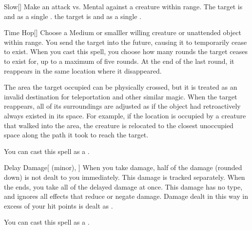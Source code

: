 \lowercase{\hypertarget{spell:Slow}{}}\label{spell:Slow}
\begin{ability}[\nth{1}]{\hypertarget{spell:Slow}{Slow}}[]
Make an attack vs. Mental against a creature within \rngmed range.
\hit The target is  and  as a single .
\crit the target is  and  as a single .
\end{ability}
\vspace{0.25em}



\lowercase{\hypertarget{spell:Time Hop}{}}\label{spell:Time Hop}
\begin{ability}[\nth{2}]{\hypertarget{spell:Time Hop}{Time Hop}}[]
Choose a Medium or smalller willing creature or unattended object within \rngmed range.
You send the target into the future, causing it to temporarily cease to exist.
When you cast this spell, you choose how many rounds the target ceases to exist for, up to a maximum of five rounds.
At the end of the last round, it reappears in the same location where it disappeared.

The area the target occupied can be physically crossed, but it is treated as an invalid destination for teleportation and other similar magic.
When the target reappears, all of its surroundings are adjusted as if the object had retroactively always existed in its space.
For example, if the location is occupied by a creature that walked into the area, the creature is relocated to the closest unoccupied space along the path it took to reach the target.

You can cast this spell as a .
\end{ability}
\vspace{0.25em}



\lowercase{\hypertarget{spell:Delay Damage}{}}\label{spell:Delay Damage}
\begin{ability}[\nth{3}]{\hypertarget{spell:Delay Damage}{Delay Damage}}[ (minor), ]
When you take damage, half of the damage (rounded down) is not dealt to you immediately.
This damage is tracked separately.
When the ends, you take all of the delayed damage at once.
This damage has no type, and ignores all effects that reduce or negate damage.
Damage dealt in this way in excess of your hit points is dealt as .

You can cast this spell as a .
\end{ability}
\vspace{0.25em}



